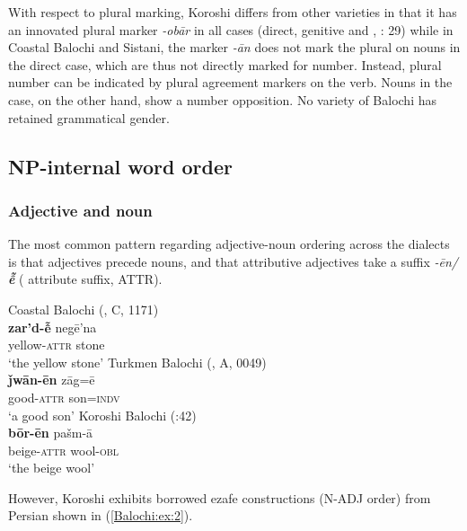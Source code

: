 \documentclass[output=paper,colorlinks,citecolor=brown,draftmode]{langscibook}
\begin{document}
With respect to plural marking, Koroshi differs from other varieties in that it has an innovated plural marker \textit{-obār} in all cases (direct, genitive and , \citealt{nourzaei_koroshi_2015}: 29) while in Coastal Balochi and Sistani, the marker \textit{-ān} does not mark the plural on nouns in the direct case, which are thus not directly marked for number. Instead, plural number can be indicated by plural agreement markers on the verb. Nouns in the  case, on the other hand, show a number opposition. No variety of Balochi has retained grammatical gender.

\subsection{NP-internal word order}\label{Balochi:ss:3.2}

\subsubsection{Adjective and noun}\label{Balochi:ss:3.2.1}

The most common pattern regarding adjective-noun ordering across the dialects is that adjectives precede nouns, and that attributive adjectives take a suffix \textit{-ēn/\textbf{ễ}} ( attribute suffix, \textsc{ATTR}). 

\ea\label{Balochi:ex:1}
\ea\label{Balochi:ex:1a}
Coastal Balochi (\citealt{nourzaei_balochi_coastal_2021}, C, 1171)\\
\gll \textbf{zar'd-ễ} negē'na \\
yellow-\textsc{attr} stone \\
\glt `the yellow stone'
\ex\label{Balochi:ex:1b}
Turkmen Balochi (\citealt{haig_balochi_2022}, A, 0049)\\
\gll \textbf{ǰwān-ēn} zāg=ē \\
good-\textsc{attr} son=\textsc{indv} \\
\glt `a good son' 
\ex\label{Balochi:ex:1c}
Koroshi Balochi (\citealt{nourzaei_koroshi_2015}:42)\\
\gll \textbf{bōr-ēn} pašm-ā \\
beige-\textsc{attr} wool-\textsc{obl} \\
\glt `the beige wool'
\z
\z

However, Koroshi exhibits borrowed ezafe constructions (N-ADJ order) from Persian shown in (\ref{Balochi:ex:2}).
\end{document}
